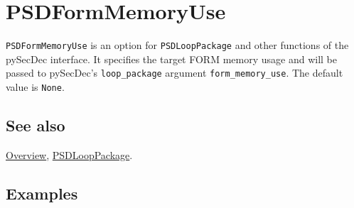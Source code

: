 \documentclass[../FeynHelpersManual.tex]{subfiles}
\begin{document}
\hypertarget{psdformmemoryuse}{
\section{PSDFormMemoryUse}\label{psdformmemoryuse}}

\texttt{PSDFormMemoryUse} is an option for \texttt{PSDLoopPackage} and
other functions of the pySecDec interface. It specifies the target FORM
memory usage and will be passed to pySecDec's \texttt{loop_package}
argument \texttt{form_memory_use}. The default value is \texttt{None}.

\subsection{See also}

\hyperlink{toc}{Overview}, \hyperlink{psdlooppackage}{PSDLoopPackage}.

\subsection{Examples}
\end{document}
